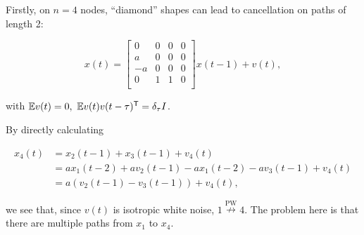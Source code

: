 \documentclass[12pt]{article}
\def\npwgc{\overset{\text{PW}}{\nrightarrow}}  %
\begin{document}
\begin{example}
  \label{ex:diamond_cancellation}
  Firstly, on $n = 4$ nodes, ``diamond'' shapes can lead to cancellation on paths of length 2:

\begin{equation*}
  x(t) =
  \left[
    \begin{array}{cccc}
      0 & 0 & 0 & 0\\
      a & 0 & 0 & 0\\
      -a & 0 & 0 & 0\\
      0 & 1 & 1 & 0\\
    \end{array}
  \right] x(t - 1) + v(t),
\end{equation*}

with $\mathbb{E} v(t) = 0,\ \mathbb{E} v(t)v(t - \tau)^{\mathsf{T}} = \delta_\tau I$.

By directly calculating

\begin{align*}
  x_4(t) &= x_2(t - 1) + x_3(t - 1) + v_4(t)\\
         &= ax_1(t - 2) + av_2(t - 1) - ax_1(t - 2) -av_3(t - 1) + v_4(t)\\
         &= a(v_2(t - 1) - v_3(t - 1)) + v_4(t),
\end{align*}

we see that, since $v(t)$ is isotropic white noise, $1 \npwgc 4$.  The problem here is that there are multiple paths from $x_1$ to $x_4$.
\end{example}
\end{document}

